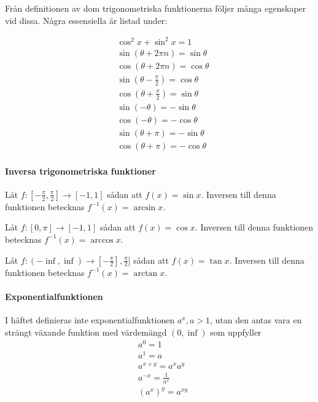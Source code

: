 Från definitionen av dom trigonometriska funktionerna följer många egenskaper vid dissa. Några essensiella är listad under:

\begin{align*}
	&\cos^2x + \sin^2x = 1\\
	&\sin\left(\theta + 2\pi n\right) = \sin\theta\\
	&\cos\left(\theta + 2\pi n\right) = \cos\theta\\
	&\sin\left(\theta - \frac{\pi}{2}\right) = \cos\theta\\
	&\cos\left(\theta + \frac{\pi}{2}\right) = \sin\theta\\
	&\sin\left(-\theta\right) = -\sin\theta\\
	&\cos\left(-\theta\right) = -\cos\theta\\
	&\sin\left(\theta+\pi\right) = -\sin\theta\\
	&\cos\left(\theta+\pi\right) = -\cos\theta
\end{align*}

\paragraph{Inversa trigonometriska funktioner}

Låt $f:\left[-\frac{\pi}{2},\frac{\pi}{2}\right]\to [-1,1]$ sådan att $f(x)=\sin x$. Inversen till denna funktionen betecknas $f^{-1}(x)=\arcsin x$.

Låt $f:[0,\pi]\to [-1,1]$ sådan att $f(x)=\cos x$. Inversen till denna funktionen betecknas $f^{-1}(x)=\arccos x$.

Låt $f:(-\inf,\inf)\to \left[-\frac{\pi}{2}\right],\frac{\pi}{2}]$ sådan att $f(x)=\tan x$. Inversen till denna funktionen betecknas $f^{-1}(x)=\arctan x$.

\paragraph{Exponentialfunktionen}

I häftet definieras inte exponentialfunktionen $a^x, a>1$, utan den antas vara en strängt växande funktion med värdemängd $(0,\inf)$ som uppfyller
\begin{align*}
	&a^0 = 1\\
	&a^1 = a\\
	&a^{x + y} = a^x a^y\\
	&a^{-x} = \frac{1}{a^x}\\
	&\left(a^x\right)^y = a^{xy}
\end{align*}

